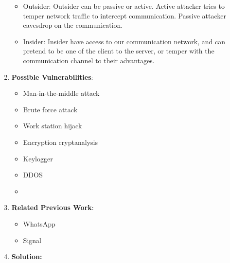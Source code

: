 \documentclass{article}
\begin{document}
\begin{enumerate}
\begin {itemize}
		    \item Outsider: Outsider can be passive or active. Active attacker tries to temper
             network traffic to intercept communication. Passive attacker eavesdrop on the 
             communication.
				
		    \item Insider: Insider have access to our communication network, and can pretend to be
             one of the client to the server, or temper with the communication channel to their 
             advantages.				
        \end {itemize}
    \item \textbf {Possible Vulnerabilities}:
    	\begin {itemize}
        	\item Man-in-the-middle attack
			\item Brute force attack
			\item Work station hijack
			\item Encryption cryptanalysis
			\item Keylogger
			\item DDOS
			\item 
        \end {itemize}
    \item \textbf {Related Previous Work}:
        \begin {itemize}
            \item WhatsApp
            \item Signal
        \end {itemize}
    \item \textbf {Solution:} 
\begin{itemize}


\end{itemize}
\end{enumerate}
\end{document}
